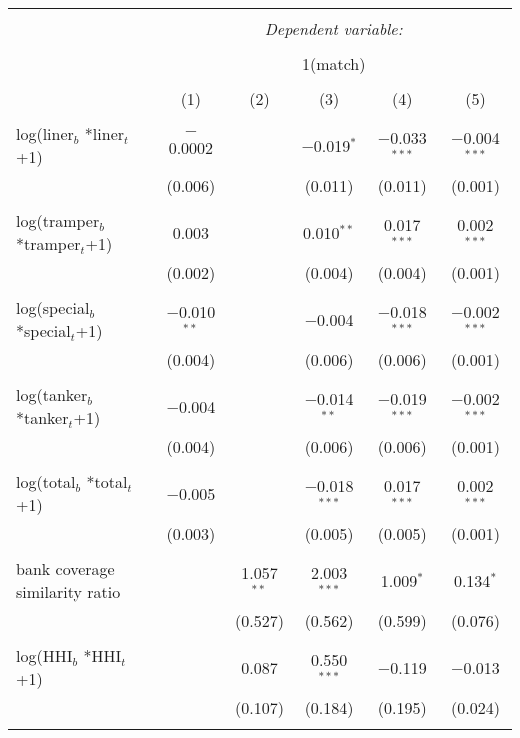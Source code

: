 
\begin{tabular}{@{\extracolsep{5pt}}lccccc} 
\\[-1.8ex]\hline 
\hline \\[-1.8ex] 
 & \multicolumn{5}{c}{\textit{Dependent variable:}} \\ 
\cline{2-6} 
\\[-1.8ex] & \multicolumn{5}{c}{1(match)} \\ 
\\[-1.8ex] & (1) & (2) & (3) & (4) & (5)\\ 
\hline \\[-1.8ex] 
 log(liner$_{b}$ *liner$_{t}$+1) & $-$0.0002 &  & $-$0.019$^{*}$ & $-$0.033$^{***}$ & $-$0.004$^{***}$ \\ 
  & (0.006) &  & (0.011) & (0.011) & (0.001) \\ 
  & & & & & \\ 
 log(tramper$_{b}$ *tramper$_{t}$+1) & 0.003 &  & 0.010$^{**}$ & 0.017$^{***}$ & 0.002$^{***}$ \\ 
  & (0.002) &  & (0.004) & (0.004) & (0.001) \\ 
  & & & & & \\ 
 log(special$_{b}$ *special$_{t}$+1) & $-$0.010$^{**}$ &  & $-$0.004 & $-$0.018$^{***}$ & $-$0.002$^{***}$ \\ 
  & (0.004) &  & (0.006) & (0.006) & (0.001) \\ 
  & & & & & \\ 
 log(tanker$_{b}$ *tanker$_{t}$+1) & $-$0.004 &  & $-$0.014$^{**}$ & $-$0.019$^{***}$ & $-$0.002$^{***}$ \\ 
  & (0.004) &  & (0.006) & (0.006) & (0.001) \\ 
  & & & & & \\ 
 log(total$_{b}$ *total$_{t}$+1) & $-$0.005 &  & $-$0.018$^{***}$ & 0.017$^{***}$ & 0.002$^{***}$ \\ 
  & (0.003) &  & (0.005) & (0.005) & (0.001) \\ 
  & & & & & \\ 
 bank coverage similarity ratio &  & 1.057$^{**}$ & 2.003$^{***}$ & 1.009$^{*}$ & 0.134$^{*}$ \\ 
  &  & (0.527) & (0.562) & (0.599) & (0.076) \\ 
  & & & & & \\ 
 log(HHI$_{b}$ *HHI$_{t}$+1) &  & 0.087 & 0.550$^{***}$ & $-$0.119 & $-$0.013 \\ 
  &  & (0.107) & (0.184) & (0.195) & (0.024) \\ 
  & & & & & \\ 

\end{tabular}
